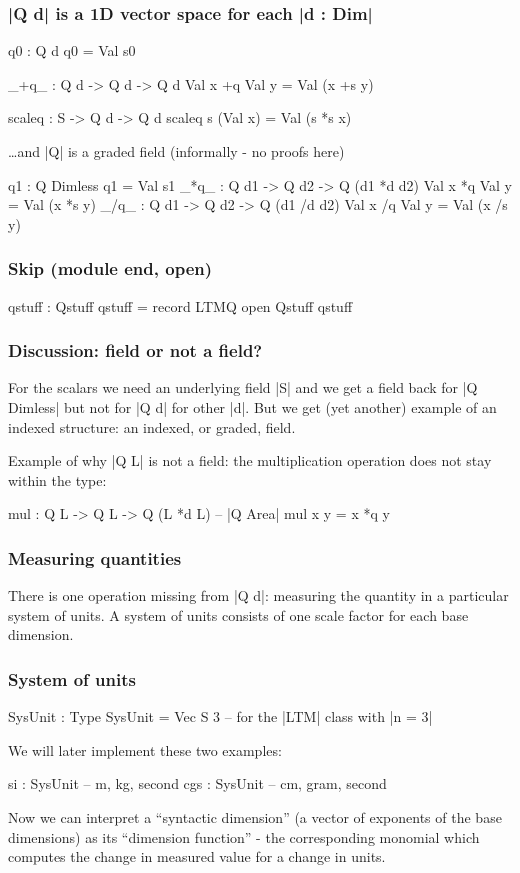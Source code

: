 \documentclass{beamer}
\begin{document}
\begin{frame}
\frametitle{|Q d| is a 1D vector space for each |d : Dim|}
\begin{code}
    q0 : Q d
    q0 = Val s0

    _+q_ : Q d  -> Q d  -> Q d
    Val x +q Val y = Val (x +s y)

    scaleq : S -> Q d -> Q d
    scaleq s (Val x) = Val (s *s x)
\end{code}

\pause 
\ldots and |Q| is a graded field (informally - no proofs here)
\begin{code}
    q1  : Q Dimless
    q1 = Val s1
    _*q_ : Q d1 -> Q d2 -> Q (d1 *d d2)
    Val x *q Val y = Val (x *s y)
    _/q_ : Q d1 -> Q d2 -> Q (d1 /d d2)
    Val x /q Val y = Val (x /s y)
\end{code}
\subsubsection{Skip (module end, open)}
\begin{code}
  qstuff : Qstuff
  qstuff = record { LTMQ }
  open Qstuff qstuff
\end{code}

\end{frame}
\begin{frame}
\frametitle{Discussion: field or not a field?}

For the scalars we need an underlying field |S| and we get a field
back for |Q Dimless| but not for |Q d| for other |d|. But we get (yet
another) example of an indexed structure: an indexed, or graded, field.

Example of why |Q L| is not a field: the multiplication operation
does not stay within the type:

\begin{code}
  mul : Q L -> Q L -> Q (L *d L) -- |Q Area|
  mul x y = x *q y
\end{code}

\end{frame}
\begin{frame}
\frametitle{Measuring quantities}

There is one operation missing from |Q d|: measuring the quantity in a
particular system of units. A system of units consists of one scale
factor for each base dimension.
\subsubsection{System of units}
\begin{code}
  SysUnit : Type
  SysUnit = Vec S 3   -- for the |LTM| class with |n = 3|
\end{code}
We will later implement these two examples:
\begin{spec}
  si   : SysUnit  -- m, kg, second
  cgs  : SysUnit  -- cm, gram, second
\end{spec}

Now we can interpret a ``syntactic dimension'' (a vector of exponents of
the base dimensions) as its ``dimension function'' - the corresponding
monomial which computes the change in measured value for a change in
units.
\end{frame}
\end{document}
